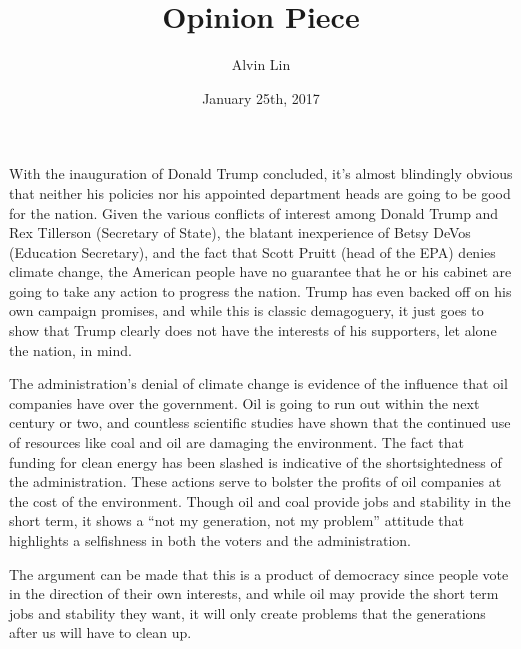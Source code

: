 \documentclass{article}
\title{Opinion Piece}
\author{Alvin Lin}
\date{January 25th, 2017}
\begin{document}
\maketitle

With the inauguration of Donald Trump concluded, it's almost blindingly obvious that neither his policies nor his appointed department heads are going to be good for the nation. Given the various conflicts of interest among Donald Trump and Rex Tillerson (Secretary of State), the blatant inexperience of Betsy DeVos (Education Secretary), and the fact that Scott Pruitt (head of the EPA) denies climate change, the American people have no guarantee that he or his cabinet are going to take any action to progress the nation. Trump has even backed off on his own campaign promises, and while this is classic demagoguery, it just goes to show that Trump clearly does not have the interests of his supporters, let alone the nation, in mind. \par
The administration's denial of climate change is evidence of the influence that oil companies have over the government. Oil is going to run out within the next century or two, and countless scientific studies have shown that the continued use of resources like coal and oil are damaging the environment. The fact that funding for clean energy has been slashed is indicative of the shortsightedness of the administration. These actions serve to bolster the profits of oil companies at the cost of the environment. Though oil and coal provide jobs and stability in the short term, it shows a ``not my generation, not my problem'' attitude that highlights a selfishness in both the voters and the administration. \par
The argument can be made that this is a product of democracy since people vote in the direction of their own interests, and while oil may provide the short term jobs and stability they want, it will only create problems that the generations after us will have to clean up.
\end{document}
